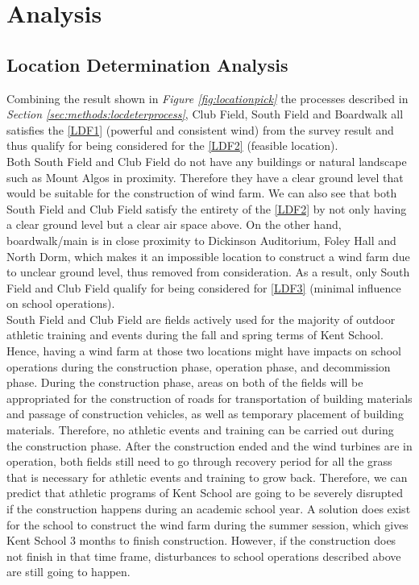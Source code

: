 \documentclass[review]{elsarticle}
\begin{document}
\section{Analysis}
\label{sec:analysis}

\subsection{Location Determination Analysis}

Combining the result shown in \textit{Figure \ref{fig:locationpick}} the processes described in \textit{Section \ref{sec:methods:locdeterprocess}}, 
Club Field, South Field and Boardwalk all satisfies the \ref{LDF1} (powerful and consistent wind) from the survey 
result and thus qualify for being considered for the \ref{LDF2} (feasible location).  %
\\\indent Both South Field and Club Field do not have any buildings or natural landscape such as Mount Algos in proximity. Therefore 
they have a clear ground level that would be suitable for the construction of wind farm. We can also see that both South Field and Club 
Field satisfy the entirety of the \ref{LDF2} by not only having a clear ground level but a clear air space above. 
On the other hand, boardwalk/main is in close proximity to Dickinson Auditorium, Foley Hall and North Dorm, which makes it an impossible 
location to construct a wind farm due to unclear ground level, thus removed from consideration. As a result, only South Field and Club 
Field qualify for being considered for \ref{LDF3} (minimal influence on school operations).
\\\indent South Field and Club Field are fields actively used for the majority of outdoor athletic training and events during the fall 
and spring terms of Kent School. Hence, having a wind farm at those two locations might have impacts on school operations during the 
construction phase, operation phase, and decommission phase. During the construction phase, areas on both of the fields will be appropriated 
for the construction of roads for transportation of building materials and passage of construction vehicles, as well as temporary placement 
of building materials. Therefore, no athletic events and training can be carried out during the construction phase. After the construction 
ended and the wind turbines are in operation, both fields still need to go through recovery period for all the grass that is necessary for 
athletic events and training to grow back. Therefore, we can predict that athletic programs of Kent School are going to be severely disrupted 
if the construction happens during an academic school year. A solution does exist for the school to construct the wind farm during the summer 
session, which gives Kent School 3 months to finish construction. However, if the construction does not finish in that time frame, disturbances 
to school operations described above are still going to happen. %
\end{document}
